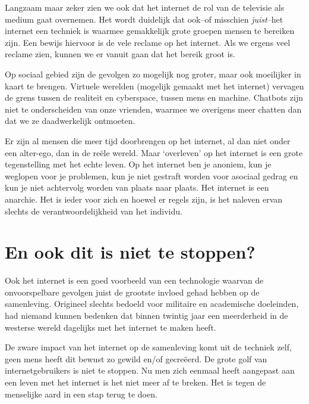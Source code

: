 \documentclass[11pt]{report}
\begin{document}
Langzaam maar zeker zien we ook dat het internet de rol van de televisie als medium gaat overnemen. Het wordt duidelijk dat ook--of misschien \emph{juist}--het internet een techniek is waarmee gemakkelijk grote groepen mensen te bereiken zijn. Een bewijs hiervoor is de vele reclame op het internet. Als we ergens veel reclame zien, kunnen we er vanuit gaan dat het bereik groot is.

Op sociaal gebied zijn de gevolgen zo mogelijk nog groter, maar ook moeilijker in kaart te brengen. Virtuele werelden (mogelijk gemaakt met het internet) vervagen de grens tussen de realiteit en cyberspace, tussen mens en machine. Chatbots zijn niet te onderscheiden van onze vrienden, waarmee we overigens meer chatten dan dat we ze daadwerkelijk ontmoeten.

Er zijn al mensen die meer tijd doorbrengen op het internet, al dan niet onder een alter-ego, dan in de re\"ele wereld. Maar `overleven' op het internet is een grote tegenstelling met het echte leven. Op het internet ben je anoniem, kun je weglopen voor je problemen, kun je niet gestraft worden voor asociaal gedrag en kun je niet achtervolg worden van plaats naar plaats. Het internet is een anarchie. Het is ieder voor zich en hoewel er regels zijn, is het naleven ervan slechts de verantwoordelijkheid van het individu.


\section{En ook dit is niet te stoppen?}

Ook het internet is een goed voorbeeld van een technologie waarvan de onvoorspelbare gevolgen juist de grootste invloed gehad hebben op de samenleving. Origineel slechts bedoeld voor militaire en academische doeleinden, had niemand kunnen bedenken dat binnen twintig jaar een meerderheid in de westerse wereld dagelijks met het internet te maken heeft.

De zware impact van het internet op de samenleving komt uit de techniek zelf, geen mens heeft dit bewust zo gewild en/of gecre\"eerd. De grote golf van internetgebruikers is niet te stoppen. Nu men zich eenmaal heeft aangepast aan een leven met het internet is het niet meer af te breken. Het is tegen de menselijke aard in een stap terug te doen.

\paragraph{}
\end{document}
